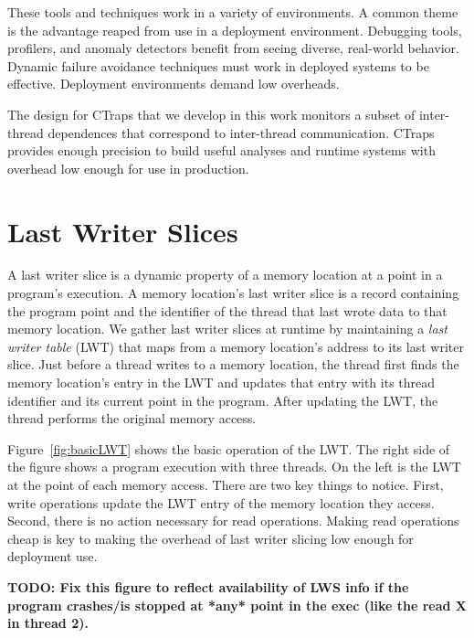 \documentclass[preprint,9pt]{sigplanconf}
\newcommand{\ctraps}{CTraps\xspace}
\newcommand{\lwt}{LWT\xspace}
\begin{document}
These tools and techniques work in a variety of environments.  A common theme
is the advantage reaped from use in a deployment environment.  Debugging tools,
profilers, and anomaly detectors benefit from seeing diverse, real-world
behavior.  Dynamic failure avoidance techniques must work in deployed systems
to be effective.  Deployment environments demand low overheads.  

The design for \ctraps that we develop in this work monitors a subset of
inter-thread dependences that correspond to inter-thread communication.
\ctraps provides enough precision to build useful analyses and runtime systems
with overhead low enough for use in production.



\section{Last Writer Slices}
\label{sec:lastwriterslices}
A last writer slice is a dynamic property of a memory location at a point in a
program's execution.   A memory location's last writer slice is a record
containing the program point and the identifier of the thread that last wrote
data to that memory location.  We gather last writer slices at runtime by
maintaining a {\em last writer table} (\lwt) that maps from a memory
location's address to its last writer slice.  Just before a thread writes to a
memory location,  the thread first finds the memory location's entry in the
\lwt and updates that entry with its thread identifier and its current point in the
program.  After updating the \lwt, the thread performs the original memory
access.

Figure~\ref{fig:basicLWT} shows the basic operation of the \lwt.  The right
side of the figure shows a program execution with three threads.  On the left
is the \lwt at the point of each memory access.  There are two key things to
notice.  First, write operations update the \lwt entry of the memory location
they access.  Second, there is no action necessary for read operations.
Making read operations cheap is key to making the overhead of last writer
slicing low enough for deployment use.

{\bf TODO: Fix this figure to reflect availability of LWS info if the program crashes/is stopped at *any* point in the exec (like the read X in thread 2).}
\end{document}
